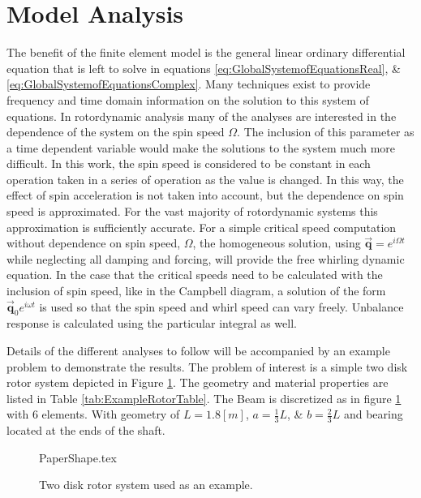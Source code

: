 \section{Model Analysis}\label{ModelAnalysis}
The benefit of the finite element model is the general linear ordinary differential equation that is left to solve in equations \eqref{eq:GlobalSystemofEquationsReal}, \& \eqref{eq:GlobalSystemofEquationsComplex}. Many techniques exist to provide frequency and time domain information on the solution to this system of equations. In rotordynamic analysis many of the analyses are interested in the dependence of the system on the spin speed $ \Omega $. The inclusion of this parameter as a time dependent variable would make the solutions to the system much more difficult. In this work, the spin speed is considered to be constant in each operation taken in a series of operation as the value is changed. In this way, the effect of spin acceleration is not taken into account, but the dependence on spin speed is approximated. For the vast majority of rotordynamic systems this approximation is sufficiently accurate.
For a simple critical speed computation without dependence on spin speed, $ \Omega $, the homogeneous solution, using $ \vec{\mathbf{q}}=e^{i\Omega t} $ while neglecting all damping and forcing, will provide the free whirling dynamic equation. In the case that the critical speeds need to be calculated with the inclusion of spin speed, like in the Campbell diagram, a solution of the form $  \vec{\mathbf{q}}_0e^{i\omega t}$ is used so that the spin speed and whirl speed can vary freely. Unbalance response is calculated using the particular integral as well.\par 
Details of the different analyses to follow will be accompanied by an example problem to demonstrate the results. The problem of interest is a simple two disk rotor system depicted in Figure \ref{fig:ExampleRotorSystem}. The geometry and material properties are listed in Table \ref{tab:ExampleRotorTable}. The Beam is discretized as in figure \ref{fig:ExampleRotorSystem} with 6 elements. With geometry of $ L=1.8[m] $, $ a=\frac{1}{3}L $, \& $ b=\frac{2}{3}L $ and bearing located at the ends of the shaft.\par 
\begin{figure}
	\centering
	{PaperShape.tex}
	\caption{Two disk rotor system used as an example.}
	\label{fig:ExampleRotorSystem}
\end{figure}

